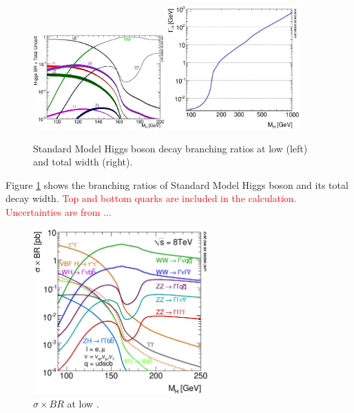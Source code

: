 \begin{figure}[t]
\centering
\includegraphics[width=0.45\textwidth]{figures/YRHXS2_BR_Fig1.eps}
\includegraphics[width=0.45\textwidth]{figures/YRHXS_BR_fig2}
\caption{Standard Model Higgs boson decay branching ratios at low \mHi(left) 
and total width (right).}
\label{fig:YRHXS2_BR_Fig1}
\end{figure}
Figure \ref{fig:YRHXS2_BR_Fig1} shows the branching ratios of Standard 
Model Higgs boson and its total decay width. \textcolor{red}{Top and bottom quarks are 
included in the calculation. Uncertainties are from ...} 

\begin{figure}[t]
\centering
\includegraphics[width=0.6\textwidth]{figures/XSBR_8TeV_SM_LM.eps}
\caption{$\sigma \times BR$ at low \mHi.}
\label{fig:XSBR_8TeV_SM_LM}
\end{figure}

